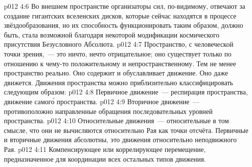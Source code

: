 \vs p012 4:6 \pc Во внешнем пространстве организаторы сил, по\hyp{}видимому, отвечают за создание гигантских вселенских дисков, которые сейчас находятся в процессе звёздообразования, но их способность функционировать таким образом, должно быть, стала возможной благодаря некоторой модификации космического присутствия Безусловного Абсолюта.
\vs p012 4:7 \pc Пространство, с человеческой точки зрения,~--- это ничто, нечто отрицательное; оно существует только по отношению к чему\hyp{}то положительному и непространственному. Тем не менее пространство реально. Оно содержит и обуславливает движение. Оно даже движется. Движения пространства можно приблизительно классифицировать следующим образом:
\vs p012 4:8 Первичное движение~--- респирация пространства, движение самог\'о пространства.
\vs p012 4:9 Вторичное движение~--- противоположно направленные обращения последовательных уровней пространства.
\vs p012 4:10 Относительные движения~--- относительные в том смысле, что они не вычисляются относительно Рая как точки отсчёта. Первичные и вторичные движения абсолютны, это движения относительно неподвижного Рая.
\vs p012 4:11 Компенсирующее или коррелирующее перемещение, предназначенное для координации всех остальных типов движения.
